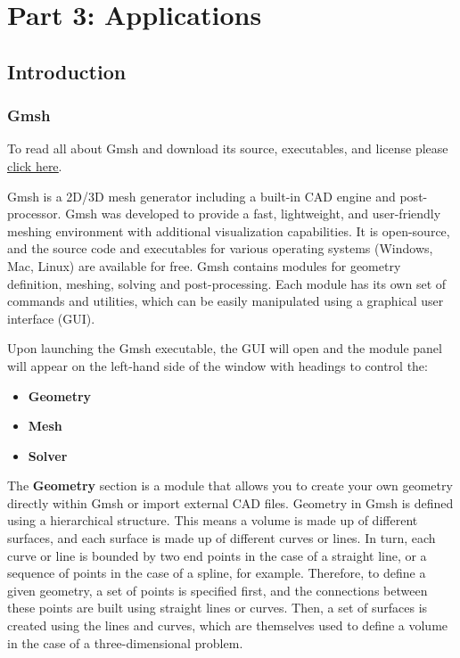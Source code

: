 \part{Part 3: Applications}

\graphicspath{ {./Pictures/} }

\chapter{Introduction}
\label{ch:intro for tutorials}
\section*{Gmsh}
\begin{gmshnote}
	To read all about Gmsh and download its source, executables, and license please \href{http://gmsh.info}{\underline{click here}}.
\end{gmshnote}
Gmsh is a 2D/3D mesh generator including a built-in CAD engine and post-processor. Gmsh was developed to provide a fast, lightweight, and user-friendly meshing environment with additional visualization capabilities. It is open-source, and the source code and executables for various operating systems (Windows, Mac, Linux) are available for free. Gmsh contains modules for geometry definition, meshing, solving and post-processing. Each module has its own set of commands and utilities, which can be easily manipulated using a graphical user interface (GUI).

Upon launching the Gmsh executable, the GUI will open and the module panel will appear on the left-hand side of the window with headings to control the:
\begin{itemize}
    \item \textbf{Geometry}
    \item \textbf{Mesh}
    \item \textbf{Solver}
\end{itemize}
The \textbf{Geometry} section is a module that allows you to create your own geometry directly within Gmsh or import external CAD files. Geometry in Gmsh is defined using a hierarchical structure. This means a volume is made up of different surfaces, and each surface is made up of different curves or lines. In turn, each curve or line is bounded by two end points in the case of a straight line, or a sequence of points in the case of a spline, for example. Therefore, to define a given geometry, a set of points is specified first, and the connections between these points are built using straight lines or curves. Then, a set of surfaces is created using the lines and curves, which are themselves used to define a volume in the case of a three-dimensional problem.

